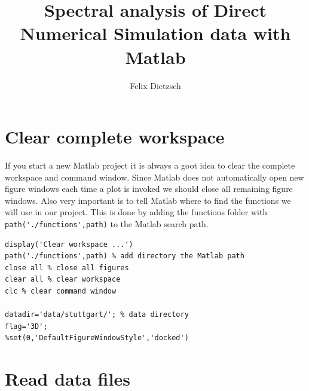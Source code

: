 \documentclass[preprint,12pt,ntfdMod]{elsarticle}
\author[rss]{Felix Dietzsch}
\title{Spectral analysis of Direct Numerical Simulation data with Matlab}
\begin{document}
		\maketitle 
		\hypersetup{linkcolor=black} 
		\tableofcontents

\section{Clear complete workspace}

\begin{par}

If you start a new Matlab project it is always a goot idea
to clear the complete workspace and command window.
Since Matlab does not automatically open new figure windows
each time a plot is invoked we should close
all remaining figure windows. Also very important is to tell
Matlab where to find the functions we will use in our project.
This is done by adding the functions folder with
\lstinline!path('./functions',path)! to the Matlab search
path.

\end{par} \vspace{1em}
\begin{verbatim}
display('Clear workspace ...')
path('./functions',path) % add directory the Matlab path
close all % close all figures
clear all % clear workspace
clc % clear command window

datadir='data/stuttgart/'; % data directory
flag='3D';
%set(0,'DefaultFigureWindowStyle','docked')
\end{verbatim}


\section{Read data files}
\end{document}
